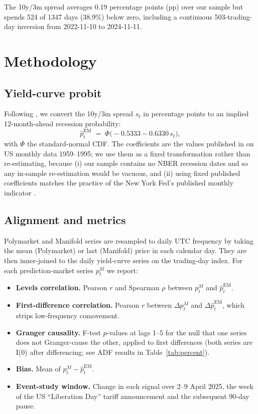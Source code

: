 \documentclass{article}
\begin{document}
The 10y/3m spread averages \num{0.19} percentage points (pp) over our sample but spends 524 of 1347 days (\num{38.9}\%) below zero, including a continuous 503-trading-day inversion from 2022-11-10 to 2024-11-11.

\section{Methodology}

\subsection{Yield-curve probit}

Following \citet{estrella1998predicting}, we convert the 10y/3m spread $s_t$ in percentage points to an implied 12-month-ahead recession probability:
\begin{equation}
\hat{p}^{\text{EM}}_t \;=\; \Phi\!\bigl(-0.5333 - 0.6330\, s_t\bigr),
\label{eq:em}
\end{equation}
with $\Phi$ the standard-normal CDF. The coefficients are the values published in \citet{estrella1998predicting} on US monthly data 1959--1995; we use them as a fixed transformation rather than re-estimating, because (i) our sample contains no NBER recession dates and so any in-sample re-estimation would be vacuous, and (ii) using fixed published coefficients matches the practice of the New York Fed's published monthly indicator \citep{nyfed_yieldcurve}.

\subsection{Alignment and metrics}

Polymarket and Manifold series are resampled to daily UTC frequency by taking the mean (Polymarket) or last (Manifold) price in each calendar day. They are then inner-joined to the daily yield-curve series on the trading-day index. For each prediction-market series $p^M_t$ we report:
\begin{itemize}[itemsep=1pt,topsep=2pt,leftmargin=12pt]
\item \textbf{Levels correlation.} Pearson $r$ and Spearman $\rho$ between $p^M_t$ and $\hat{p}^{\text{EM}}_t$.
\item \textbf{First-difference correlation.} Pearson $r$ between $\Delta p^M_t$ and $\Delta \hat{p}^{\text{EM}}_t$, which strips low-frequency comovement.
\item \textbf{Granger causality.} F-test $p$-values at lags 1--5 for the null that one series does not Granger-cause the other, applied to first differences (both series are I(0) after differencing; see ADF results in Table~\ref{tab:percent}).
\item \textbf{Bias.} Mean of $p^M_t - \hat{p}^{\text{EM}}_t$.
\item \textbf{Event-study window.} Change in each signal over 2--9 April 2025, the week of the US ``Liberation Day'' tariff announcement and the subsequent 90-day pause.
\end{itemize}
\end{document}
